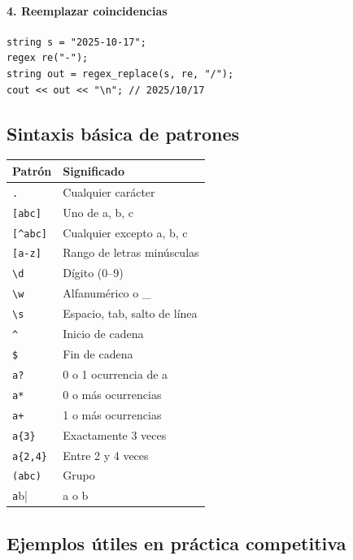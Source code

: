 \documentclass{article}
\begin{document}
\paragraph{4. Reemplazar coincidencias}
\begin{lstlisting}[style=cppstyle]
string s = "2025-10-17";
regex re("-"); 
string out = regex_replace(s, re, "/");
cout << out << "\n"; // 2025/10/17
\end{lstlisting}

\subsection{Sintaxis básica de patrones}

\begin{center}
\begin{tabular}{ll}
\hline
Patrón & Significado \\
\hline
\lstinline|.| & Cualquier carácter \\
\lstinline|[abc]| & Uno de a, b, c \\
\lstinline|[^abc]| & Cualquier excepto a, b, c \\
\lstinline|[a-z]| & Rango de letras minúsculas \\
\lstinline|\d| & Dígito (0–9) \\
\lstinline|\w| & Alfanumérico o \_ \\
\lstinline|\s| & Espacio, tab, salto de línea \\
\lstinline|^| & Inicio de cadena \\
\lstinline|$| & Fin de cadena \\
\lstinline|a?| & 0 o 1 ocurrencia de a \\
\lstinline|a*| & 0 o más ocurrencias \\
\lstinline|a+| & 1 o más ocurrencias \\
\lstinline|a{3}| & Exactamente 3 veces \\
\lstinline|a{2,4}| & Entre 2 y 4 veces \\
\lstinline|(abc)| & Grupo \\
\lstinline|a|b| & a o b \\
\hline
\end{tabular}
\end{center}

\subsection{Ejemplos útiles en práctica competitiva}
\end{document}
